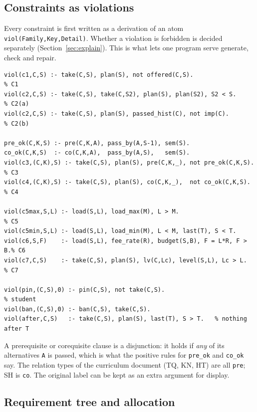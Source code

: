 \documentclass[10pt,a4paper]{article}
\begin{document}
\subsection{Constraints as violations}
\label{sec:asp-viol}
 
Every constraint is first written as a derivation of an atom
\texttt{viol(Family,Key,Detail)}. Whether a violation is forbidden is decided
separately (Section~\ref{sec:explain}). This is what lets one program serve
generate, check and repair.
\begin{lstlisting}
viol(c1,C,S) :- take(C,S), plan(S), not offered(C,S).                  % C1
viol(c2,C,S) :- take(C,S), take(C,S2), plan(S), plan(S2), S2 < S.      % C2(a)
viol(c2,C,S) :- take(C,S), plan(S), passed_hist(C), not imp(C).        % C2(b)
 
pre_ok(C,K,S) :- pre(C,K,A), pass_by(A,S-1), sem(S).
co_ok(C,K,S)  :- co(C,K,A),  pass_by(A,S),   sem(S).
viol(c3,(C,K),S) :- take(C,S), plan(S), pre(C,K,_), not pre_ok(C,K,S). % C3
viol(c4,(C,K),S) :- take(C,S), plan(S), co(C,K,_),  not co_ok(C,K,S).  % C4
 
viol(c5max,S,L) :- load(S,L), load_max(M), L > M.                      % C5
viol(c5min,S,L) :- load(S,L), load_min(M), L < M, last(T), S < T.
viol(c6,S,F)    :- load(S,L), fee_rate(R), budget(S,B), F = L*R, F > B.% C6
viol(c7,C,S)    :- take(C,S), plan(S), lv(C,Lc), level(S,L), Lc > L.   % C7
 
viol(pin,(C,S),0) :- pin(C,S), not take(C,S).                          % student
viol(ban,(C,S),0) :- ban(C,S), take(C,S).
viol(after,C,S)   :- take(C,S), plan(S), last(T), S > T.   % nothing after T
\end{lstlisting}
A prerequisite or corequisite clause is a disjunction: it holds if
\emph{any} of its alternatives \texttt{A} is passed, which is what the
positive rules for \texttt{pre\_ok} and \texttt{co\_ok} say. The relation
types of the curriculum document (TQ, KN, HT) are all \texttt{pre}; SH is
\texttt{co}. The original label can be kept as an extra argument for display.
 
\subsection{Requirement tree and allocation}
 
\end{document}
